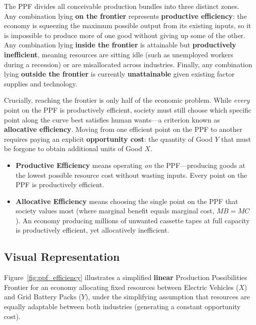 \documentclass[11pt,letterpaper]{article}
\begin{document}
The PPF divides all conceivable production bundles into three distinct zones. Any combination lying \textbf{on the frontier} represents \textbf{productive efficiency}: the economy is squeezing the maximum possible output from its existing inputs, so it is impossible to produce more of one good without giving up some of the other. Any combination lying \textbf{inside the frontier} is attainable but \textbf{productively inefficient}, meaning resources are sitting idle (such as unemployed workers during a recession) or are misallocated across industries. Finally, any combination lying \textbf{outside the frontier} is currently \textbf{unattainable} given existing factor supplies and technology.

Crucially, reaching the frontier is only half of the economic problem. While \emph{every} point on the PPF is productively efficient, society must still choose which specific point along the curve best satisfies human wants—a criterion known as \textbf{allocative efficiency}. Moving from one efficient point on the PPF to another requires paying an explicit \textbf{opportunity cost}: the quantity of Good $Y$ that must be forgone to obtain additional units of Good $X$.

\begin{coreprinciple}
\begin{itemize}
    \item \textbf{Productive Efficiency} means operating \emph{on} the PPF—producing goods at the lowest possible resource cost without wasting inputs. Every point on the PPF is productively efficient.
    \item \textbf{Allocative Efficiency} means choosing the single point on the PPF that society values most (where marginal benefit equals marginal cost, $MB = MC$). An economy producing millions of unwanted cassette tapes at full capacity is productively efficient, yet allocatively inefficient.
\end{itemize}
\end{coreprinciple}

\subsection*{Visual Representation}
Figure~\ref{fig:ppf_efficiency} illustrates a simplified \textbf{linear} Production Possibilities Frontier for an economy allocating fixed resources between Electric Vehicles ($X$) and Grid Battery Packs ($Y$), under the simplifying assumption that resources are equally adaptable between both industries (generating a constant opportunity cost).
\end{document}
